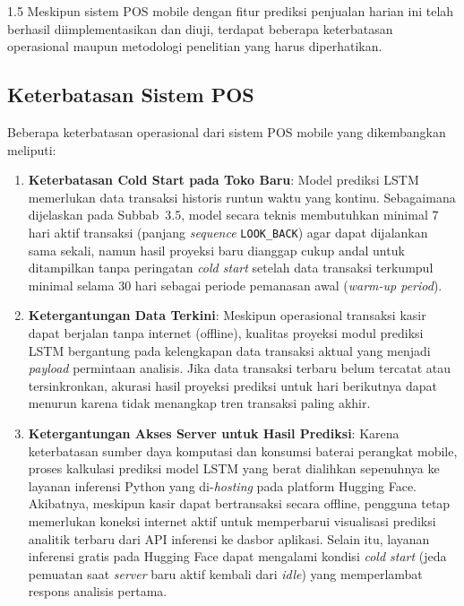 \documentclass[12pt, a4paper, onecolumn, oneside]{report}
\begin{document}
\begin{spacing}{1.5}
Meskipun sistem POS mobile dengan fitur prediksi penjualan harian ini telah berhasil diimplementasikan dan diuji, terdapat beberapa keterbatasan operasional maupun metodologi penelitian yang harus diperhatikan.

\subsection{Keterbatasan Sistem POS}

Beberapa keterbatasan operasional dari sistem POS mobile yang dikembangkan meliputi:
\begin{enumerate}
    \item \textbf{Keterbatasan Cold Start pada Toko Baru}:
    Model prediksi LSTM memerlukan data transaksi historis runtun waktu yang kontinu. Sebagaimana dijelaskan pada Subbab~3.5, model secara teknis membutuhkan minimal 7 hari aktif transaksi (panjang \textit{sequence} \texttt{LOOK\_BACK}) agar dapat dijalankan sama sekali, namun hasil proyeksi baru dianggap cukup andal untuk ditampilkan tanpa peringatan \textit{cold start} setelah data transaksi terkumpul minimal selama 30 hari sebagai periode pemanasan awal (\textit{warm-up period}).
    
    \item \textbf{Ketergantungan Data Terkini}:
    Meskipun operasional transaksi kasir dapat berjalan tanpa internet (offline), kualitas proyeksi modul prediksi LSTM bergantung pada kelengkapan data transaksi aktual yang menjadi \textit{payload} permintaan analisis. Jika data transaksi terbaru belum tercatat atau tersinkronkan, akurasi hasil proyeksi prediksi untuk hari berikutnya dapat menurun karena tidak menangkap tren transaksi paling akhir.
    
    \item \textbf{Ketergantungan Akses Server untuk Hasil Prediksi}:
    Karena keterbatasan sumber daya komputasi dan konsumsi baterai perangkat mobile, proses kalkulasi prediksi model LSTM yang berat dialihkan sepenuhnya ke layanan inferensi Python yang di-\textit{hosting} pada platform Hugging Face. Akibatnya, meskipun kasir dapat bertransaksi secara offline, pengguna tetap memerlukan koneksi internet aktif untuk memperbarui visualisasi prediksi analitik terbaru dari API inferensi ke dasbor aplikasi. Selain itu, layanan inferensi gratis pada Hugging Face dapat mengalami kondisi \textit{cold start} (jeda pemuatan saat \textit{server} baru aktif kembali dari \textit{idle}) yang memperlambat respons analisis pertama.
\end{enumerate}


\end{spacing}
\end{document}
